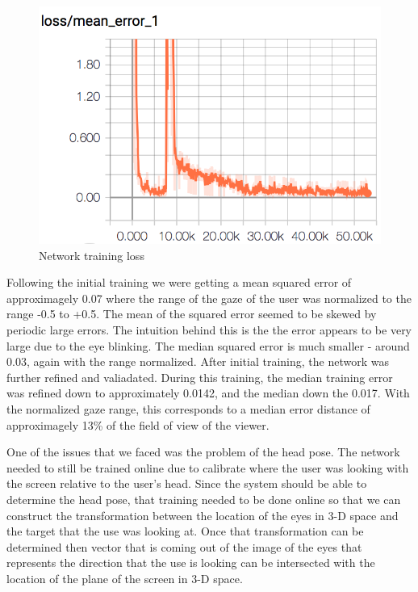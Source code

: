 \documentclass[10pt,twocolumn,letterpaper]{article}
\begin{document}
\begin{figure}[!h]
  \begin{center}
    \includegraphics[width=\linewidth]{tb-gross-training-mse-loss.png}
    \caption{Network training loss}
    \label{fig:train-loss}
  \end{center}
\end{figure}

Following the initial training we were getting a mean squared error of
approximagely 0.07 where the range of the gaze of the user was
normalized to the range -0.5 to +0.5. The mean of the squared error
seemed to be skewed by periodic large errors. The intuition behind
this is the the error appears to be very large due to the eye
blinking. The median squared error is much smaller - around 0.03,
again with the range normalized. After initial training, the network
was further refined and valiadated. During this training, the median
training error was refined down to approximately 0.0142, and the
median down the 0.017. With the normalized gaze range, this
corresponds to a median error distance of approximagely 13\% of the
field of view of the viewer.

One of the issues that we faced was the problem of the head pose.
The network needed to still be trained online due to calibrate where
the user was looking with the screen relative to the user's head.
Since the system should be able to determine the head pose,
that training needed to be done online so that we can construct the
transformation between the location of the eyes in 3-D space and the
target that the use was looking at. Once that transformation can be
determined then vector that is coming out of the image of the eyes
that represents the direction that the use is looking can be
intersected with the location of the plane of the screen in 3-D
space.
\end{document}
